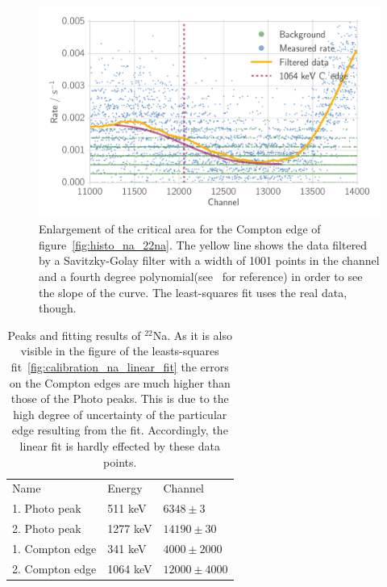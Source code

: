 \begin{figure}[htpb]
    \centering
    \includegraphics[width=0.9\linewidth]{./analysis/figures/histo_na_22na2}
    \caption{Enlargement of the critical area for the Compton edge of
    figure~\ref{fig:histo_na_22na}.     
    The yellow line shows the data filtered by a Savitzky-Golay filter 
    with a width of 1001 points in the channel and a fourth
    degree polynomial(see~\cite{scipy} for reference) in order
    to see the slope of the curve. The least-squares fit uses the real data, though.
}
\label{fig:histo_na_22na2}
\end{figure}

\begin{table}[htpb]
    \centering
    \caption{Peaks and fitting results of $^{22}$Na. As it is also visible in the figure
    of the leasts-squares fit~\ref{fig:calibration_na_linear_fit} the errors on the
    Compton edges are much higher than those of the Photo peaks. This is due to the high
    degree of uncertainty of the particular edge resulting from the fit. Accordingly, 
    the linear fit is hardly effected by these data points. }
    \label{tab:peaks_na_ps}
    \begin{tabular}{lll}
        \rowcolor{LightCyan} Name &Energy & Channel \\ 
           1. Photo peak& 511 keV & $6348 \pm 3$ \\ 
           2. Photo peak& 1277 keV & $14190 \pm 30 $\\
           1. Compton edge& 341 keV& $4000 \pm 2000$\\
           2. Compton edge& 1064 keV & $12000 \pm 4000$
    \end{tabular}
\end{table}

